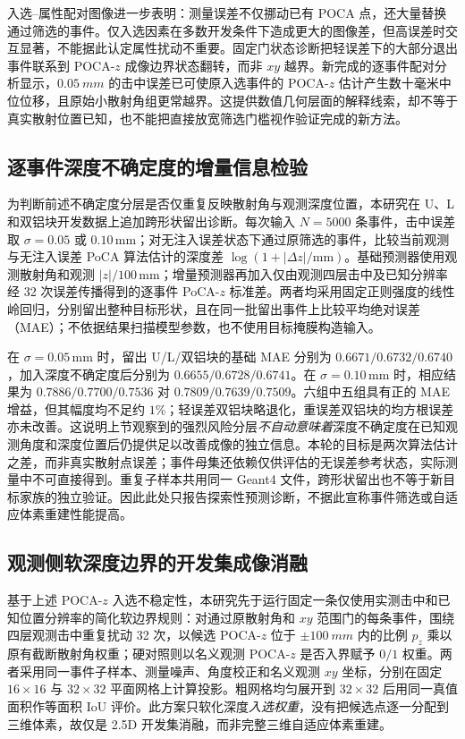 \documentclass[UTF8,fontset=none,zihao=-4,a4paper]{ctexart}
\begin{document}
入选--属性配对图像进一步表明：测量误差不仅挪动已有 POCA 点，还大量替换通过筛选的事件。仅入选因素在多数开发条件下造成更大的图像差，但高误差时交互显著，不能据此认定属性扰动不重要。固定门状态诊断把轻误差下的大部分退出事件联系到 POCA-$z$ 成像边界状态翻转，而非 $xy$ 越界。新完成的逐事件配对分析显示，$\SI{0.05}{mm}$ 的击中误差已可使原入选事件的 POCA-$z$ 估计产生数十毫米中位位移，且原始小散射角组更常越界。这提供数值几何层面的解释线索，却不等于真实散射位置已知，也不能把直接放宽筛选门槛视作验证完成的新方法。

\subsection{逐事件深度不确定度的增量信息检验}
为判断前述不确定度分层是否仅重复反映散射角与观测深度位置，本研究在 U、L 和双铝块开发数据上追加跨形状留出诊断。每次输入 $N=5000$ 条事件，击中误差取 $\sigma=0.05$ 或 $0.10\,\mathrm{mm}$；对无注入误差状态下通过原筛选的事件，比较当前观测与无注入误差 PoCA 算法估计的深度差 $\log(1+|\Delta z|/\mathrm{mm})$。基础预测器使用观测散射角和观测 $|z|/100\,\mathrm{mm}$；增量预测器再加入仅由观测四层击中及已知分辨率经 32 次误差传播得到的逐事件 PoCA-$z$ 标准差。两者均采用固定正则强度的线性岭回归，分别留出整种目标形状，且在同一批留出事件上比较平均绝对误差（MAE）；不依据结果扫描模型参数，也不使用目标掩膜构造输入。

在 $\sigma=0.05\,\mathrm{mm}$ 时，留出 U/L/双铝块的基础 MAE 分别为 $0.6671/0.6732/0.6740$，加入深度不确定度后分别为 $0.6655/0.6728/0.6741$。在 $\sigma=0.10\,\mathrm{mm}$ 时，相应结果为 $0.7886/0.7700/0.7536$ 对 $0.7809/0.7639/0.7509$。六组中五组具有正的 MAE 增益，但其幅度均不足约 $1\%$；轻误差双铝块略退化，重误差双铝块的均方根误差亦未改善。这说明上节观察到的强烈风险分层\emph{不自动意味着}深度不确定度在已知观测角度和深度位置后仍提供足以改善成像的独立信息。本轮的目标是两次算法估计之差，而非真实散射点误差；事件母集还依赖仅供评估的无误差参考状态，实际测量中不可直接得到。重复子样本共用同一 Geant4 文件，跨形状留出也不等于新目标家族的独立验证。因此此处只报告探索性预测诊断，不据此宣称事件筛选或自适应体素重建性能提高。

\subsection{观测侧软深度边界的开发集成像消融}
基于上述 POCA-$z$ 入选不稳定性，本研究先于运行固定一条仅使用实测击中和已知位置分辨率的简化软边界规则：对通过原散射角和 $xy$ 范围门的每条事件，围绕四层观测击中重复扰动 32 次，以候选 POCA-$z$ 位于 $\pm\SI{100}{mm}$ 内的比例 $p_z$ 乘以原有截断散射角权重；硬对照则以名义观测 POCA-$z$ 是否入界赋予 $0/1$ 权重。两者采用同一事件子样本、测量噪声、角度校正和名义观测 $xy$ 坐标，分别在固定 $16\times16$ 与 $32\times32$ 平面网格上计算投影。粗网格均匀展开到 $32\times32$ 后用同一真值面积作等面积 IoU 评价。此方案只软化深度\emph{入选权重}，没有把候选点逐一分配到三维体素，故仅是 2.5D 开发集消融，而非完整三维自适应体素重建。
\end{document}
